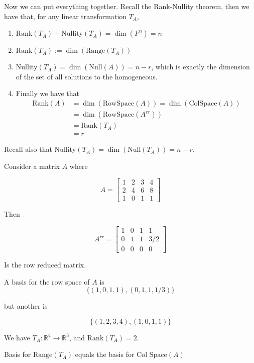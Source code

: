 \documentclass[12pt]{article}
\def\R{{\mathbb R}}
\newcommand{\rank}{\mathrm{Rank}}
\newcommand{\nullity}{\mathrm{Nullity}}
\def\range{\text{Range}}
\def\Null{\text{Null}}
\def\RowSpace{\text{RowSpace}}
\def\ColSpace{\text{ColSpace}}
\begin{document}
  Now we can put everything together. Recall the Rank-Nullity theorem, then we
  have that, for any linear transformation $T_A$,

  \begin{enumerate}
    \item $\rank(T_A) + \nullity(T_A) = \dim(F^n) = n$
    \item $\rank(T_A) := \dim(\range(T_A))$
    \item $\nullity(T_A) = \dim(\Null(A)) = n - r$, which is exactly the dimension of
      the set of all solutions to the homogeneous.
    \item Finally we have that
      \begin{align*}
        \rank(A) &= \dim(\RowSpace(A)) = \dim(\ColSpace(A)) \\
                 &= \dim(\RowSpace(A^{rr})) \\
                 &= \rank(T_A) \\
                 &= r
      \end{align*}
  \end{enumerate}

  Recall also that $\nullity(T_A) = \dim(\Null(T_A)) = n - r$.

  Consider a matrix $A$ where

  \[
    A = \begin{bmatrix}
      1 & 2 & 3 & 4 \\
      2 & 4 & 6 & 8 \\
      1 & 0 & 1 & 1
    \end{bmatrix}
  \]

  Then

  \[
    A^{rr} = \begin{bmatrix}
      1 & 0 & 1 & 1 \\
      0 & 1 & 1 & 3/2 \\
      0 & 0 & 0 & 0
    \end{bmatrix}
  \]

  Is the row reduced matrix.

  A basis for the row space of $A$ is
  \[
    \{(1, 0, 1, 1), (0, 1, 1, 1/3)\}
  \]

  but another is

  \[
    \{(1, 2, 3, 4), (1, 0, 1, 1)\}
  \]

  We have $T_A: \R^4 \to \R^3$, and $\rank(T_A) = 2$.

  Basis for $\range(T_A)$ equals the basis for $\text{Col Space}(A)$

\end{document}
